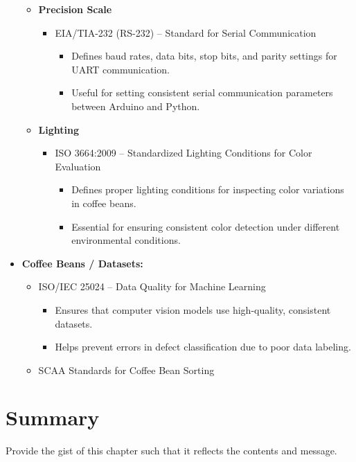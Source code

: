\begin{itemize}
\begin{itemize}
        \item \textbf{Precision Scale}
        \begin{itemize}
            \item EIA/TIA-232 (RS-232) – Standard for Serial Communication
            \begin{itemize}
                \item Defines baud rates, data bits, stop bits, and parity settings for UART communication.
                \item Useful for setting consistent serial communication parameters between Arduino and Python.
            \end{itemize}
        \end{itemize}
        
        \item \textbf{Lighting}
        \begin{itemize}
            \item ISO 3664:2009 – Standardized Lighting Conditions for Color Evaluation
            \begin{itemize}
                \item Defines proper lighting conditions for inspecting color variations in coffee beans.
                \item Essential for ensuring consistent color detection under different environmental conditions.
            \end{itemize}
        \end{itemize}
    \end{itemize}
    
    \item \textbf{Coffee Beans / Datasets:}
    \begin{itemize}
        \item ISO/IEC 25024 – Data Quality for Machine Learning
        \begin{itemize}
            \item Ensures that computer vision models use high-quality, consistent datasets.
            \item Helps prevent errors in defect classification due to poor data labeling.
        \end{itemize}
        \item SCAA Standards for Coffee Bean Sorting
    \end{itemize}
\end{itemize}

\section{Summary}

Provide the gist of this chapter such that it reflects the contents and message.